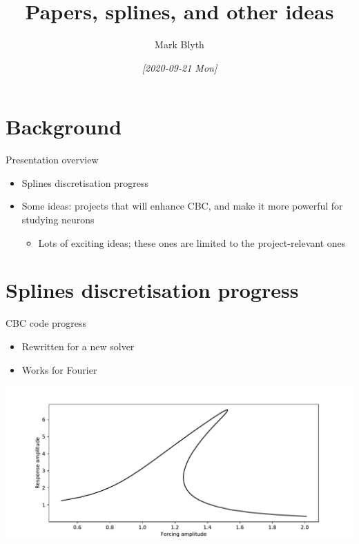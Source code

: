 \documentclass[presentation]{beamer}
\author{Mark Blyth}
\date{\textit{[2020-09-21 Mon]}}
\title{Papers, splines, and other ideas}
\begin{document}
\maketitle

\section{Background}
\label{sec:orga553dc9}
\begin{frame}[label={sec:org79733a5}]{Presentation overview}
\begin{itemize}
\item Splines discretisation progress
\end{itemize}
\vfill
\begin{itemize}
\item Some ideas: projects that will enhance CBC, and make it more powerful for studying neurons
\begin{itemize}
\item Lots of exciting ideas; these ones are limited to the project-relevant ones
\end{itemize}
\end{itemize}
\end{frame}


\section{Splines discretisation progress}
\label{sec:orgc0c9dae}
\begin{frame}[label={sec:org64fd17c}]{CBC code progress}
\begin{itemize}
\item Rewritten for a new solver
\item Works for Fourier
\end{itemize}

\begin{center}
\includegraphics[width=.9\linewidth]{./newcode.pdf}
\end{center}
\end{frame}
\end{document}
